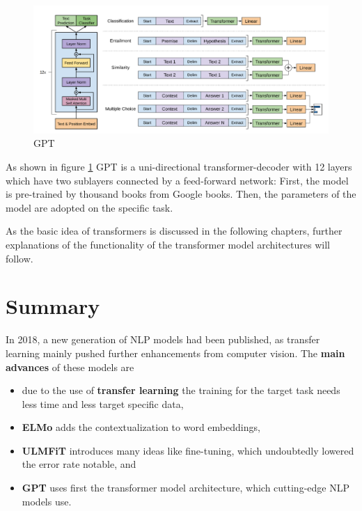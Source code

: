\documentclass[]{krantz}
\providecommand{\tightlist}{%
  \setlength{\itemsep}{0pt}\setlength{\parskip}{0pt}}
\begin{document}
\begin{figure}

{\centering \includegraphics[width=0.8\linewidth]{figures/02-01-transfer-learning-for-nlp-1/gpt} 

}

\caption{GPT}\label{fig:ch21-figuregpt}
\end{figure}

As shown in figure \ref{fig:ch21-figuregpt} GPT is a uni-directional transformer-decoder with 12 layers which have two sublayers connected by a feed-forward network:
First, the model is pre-trained by thousand books from Google books. Then, the parameters of the model are adopted on the specific task.

As the basic idea of transformers is discussed in the following chapters, further explanations of the functionality of the transformer model architectures will follow.

\hypertarget{summary}{%
\section{Summary}\label{summary}}

In 2018, a new generation of NLP models had been published, as transfer learning mainly pushed further enhancements from computer vision.
The \textbf{main advances} of these models are

\begin{itemize}
\tightlist
\item
  due to the use of \textbf{transfer learning} the training for the target task needs less time and less target specific data,
\item
  \textbf{ELMo} adds the contextualization to word embeddings,
\item
  \textbf{ULMFiT} introduces many ideas like fine-tuning, which undoubtedly lowered the error rate notable, and
\item
  \textbf{GPT} uses first the transformer model architecture, which cutting-edge NLP models use.
\end{itemize}
\end{document}
